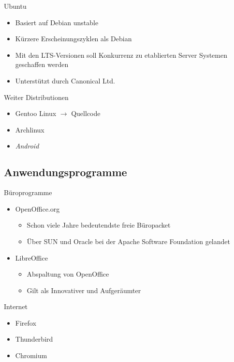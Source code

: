 \documentclass[aspectratio=43]{beamer}
\begin{document}
\begin{frame} 

	\begin{block}{Ubuntu} 
	\begin{itemize}
	\item Basiert auf Debian unstable
	\item Kürzere Erscheinungszyklen als Debian
	\item Mit den LTS-Versionen soll Konkurrenz zu etablierten Server Systemen geschaffen werden
	\item Unterstützt durch Canonical Ltd.
	\end{itemize}
	\end{block}

	\begin{block}{Weiter Distributionen} 
	\begin{itemize}
	\item Gentoo Linux $\rightarrow$ Quellcode
	\item Archlinux
	\item \textit{Android}
	\end{itemize}
	\end{block}

	
\end{frame}
\subsection{Anwendungsprogramme}
\begin{frame} 

	\begin{block}{Büroprogramme} 
	\begin{itemize}
	\item OpenOffice.org 
	\begin{itemize}
	 \item Schon viele Jahre bedeutendste freie Büropacket
	 \item Über SUN und Oracle bei der Apache Software Foundation gelandet
	\end{itemize}
	\item LibreOffice
	\begin{itemize}
	 \item Abspaltung von OpenOffice
	 \item Gilt als Innovativer und Aufgeräumter
	\end{itemize}


	\end{itemize}
	\end{block}

	\begin{block}{Internet} 
	\begin{itemize}
	\item Firefox
	\item Thunderbird
	\item Chromium
	\end{itemize}
	\end{block}

	
\end{frame}
\end{document}
